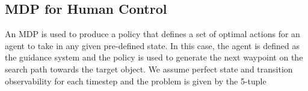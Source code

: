 \documentclass[a4paper, twoside]{article}
\begin{document}




\subsection{MDP for Human Control}

\noindent An MDP is used to produce a policy that defines a set of optimal actions for an agent to take in any given pre-defined state. In this case, the agent is defined as the guidance system and the policy is used to generate the next waypoint on the search path towards the target object. We assume perfect state and transition observability for each timestep and the problem is given by the 5-tuple
\end{document}
